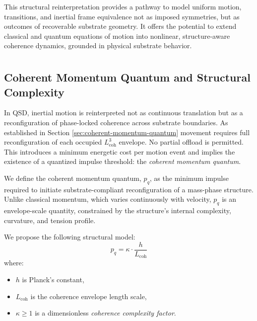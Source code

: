 \documentclass[entropy,article,submit,pdftex,moreauthors]{Definitions/mdpi}
\begin{document}
This structural reinterpretation provides a pathway to model uniform motion, transitions, and inertial frame equivalence not as imposed symmetries, but as outcomes of recoverable substrate geometry. It offers the potential to extend classical and quantum equations of motion into nonlinear, structure-aware coherence dynamics, grounded in physical substrate behavior.

\section[\appendixname~\thesection]{}
\subsection[\appendixname~\thesubsection]{Coherent Momentum Quantum and Structural Complexity}
\label{app:coherent-momentum-quantum}
In QSD, inertial motion is reinterpreted not as continuous translation but as a reconfiguration of phase-locked coherence across substrate boundaries. As established in Section \ref{sec:coherent-momentum-quantum} movement requires full reconfiguration of each occupied \texorpdfstring{\( L_{\text{coh}}^3 \)}{Lcoh\^{}3} envelope. No partial offload is permitted. This introduces a minimum energetic cost per motion event and implies the existence of a quantized impulse threshold: the \textit{coherent momentum quantum}.

We define the coherent momentum quantum, \texorpdfstring{\( p_q \)}{pq}, as the minimum impulse required to initiate substrate-compliant reconfiguration of a mass-phase structure. Unlike classical momentum, which varies continuously with velocity, \texorpdfstring{\( p_q \)}{pq} is an envelope-scale quantity, constrained by the structure's internal complexity, curvature, and tension profile.

We propose the following structural model:
\[
p_q = \kappa \cdot \frac{h}{L_{\text{coh}}}
\]
where:
\begin{itemize}
    \item \( h \) is Planck’s constant,
    \item \( L_{\text{coh}} \) is the coherence envelope length scale,
    \item \( \kappa \geq 1 \) is a dimensionless \textit{coherence complexity factor}.
\end{itemize}
\end{document}
